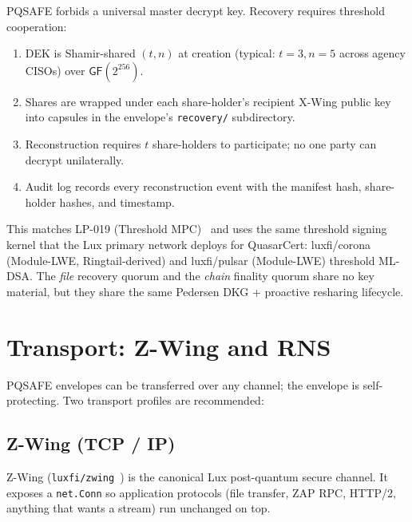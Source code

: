 \documentclass[11pt,a4paper]{article}
\begin{document}
PQSAFE forbids a universal master decrypt key. Recovery requires
threshold cooperation:

\begin{enumerate}[leftmargin=*,itemsep=0pt]
\item DEK is Shamir-shared $(t, n)$ at creation (typical: $t=3, n=5$ across
  agency CISOs) over $\textsf{GF}(2^{256})$.
\item Shares are wrapped under each share-holder's recipient X-Wing
  public key into capsules in the envelope's \texttt{recovery/}
  subdirectory.
\item Reconstruction requires $t$ share-holders to participate; no one
  party can decrypt unilaterally.
\item Audit log records every reconstruction event with the manifest
  hash, share-holder hashes, and timestamp.
\end{enumerate}

This matches LP-019 (Threshold MPC)~\cite{lp019} and uses the same
threshold signing kernel that the Lux primary network deploys for
QuasarCert: luxfi/corona (Module-LWE, Ringtail-derived) and luxfi/pulsar (Module-LWE)
threshold ML-DSA. The \emph{file} recovery quorum and the \emph{chain}
finality quorum share no key material, but they share the same Pedersen
DKG + proactive resharing lifecycle.

\section{Transport: Z-Wing and RNS}
\label{sec:transport}

PQSAFE envelopes can be transferred over any channel; the envelope is
self-protecting. Two transport profiles are recommended:

\subsection{Z-Wing (TCP / IP)}

Z-Wing (\texttt{luxfi/zwing}~\cite{luxzwing}) is the canonical Lux
post-quantum secure channel. It exposes a \texttt{net.Conn} so
application protocols (file transfer, ZAP RPC, HTTP/2, anything
that wants a stream) run unchanged on top.
\end{document}
